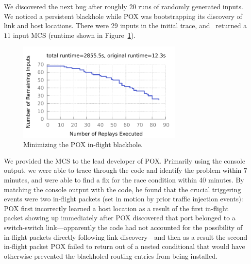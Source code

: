  We
discovered the next bug after roughly 20 runs of randomly generated inputs.
We noticed a persistent blackhole while POX was bootstrapping its
discovery of link and host locations. There were $29$ inputs in the initial trace, and \projectname~returned a $11$ input
MCS (runtime shown in Figure~\ref{fig:pox_discovery}).

\begin{figure}[t]
    \includegraphics[width=3.25in]{../graphs/runtime/pox_blackhole.pdf}
    \caption[]{\label{fig:pox_discovery} Minimizing the POX in-flight blackhole.}
\end{figure}

We provided the MCS to the lead developer of POX. Primarily using the
console output, we were able to trace through the code and identify the problem
within 7 minutes, and were able to find a fix for the race condition within 40
minutes. By matching the console output with the code, he found that the crucial
triggering events were two
in-flight packets (set in motion by prior traffic injection events):
POX first incorrectly learned a host location as a result of the first in-flight
packet showing up immediately after POX discovered that port belonged to
a switch-switch link---apparently the code had not accounted for the
possibility of in-flight packets directly following link discovery---and
then as a result the
second in-flight packet
POX failed to return out of a nested conditional that would have
otherwise prevented the blackholed routing entries from being installed.

